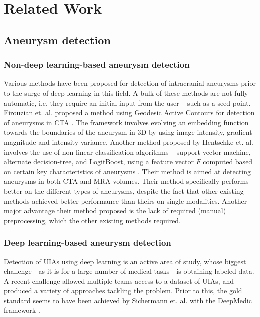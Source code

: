 \chapter{Related Work}


\section{Aneurysm detection}
\subsection{Non-deep learning-based aneurysm detection}
Various methods have been proposed for detection of intracranial aneurysms prior to the surge of deep learning in this field. A bulk of these methods are not fully automatic, i.e. they require an initial input from the user -- such as a seed point. Firouzian et. al. proposed a method using Geodesic Active Contours for detection of aneurysms in CTA \cite{Firouzian2011}. The framework involves evolving an embedding function towards the boundaries of the aneurysm in 3D by using image intensity, gradient magnitude and intensity variance.  
Another method proposed by Hentschke et. al. involves the use of non-linear classification algorithms -- support-vector-machine, alternate decision-tree, and LogitBoost, using a feature vector $F$ computed based on certain key characteristics of aneurysms \cite{Hentschke2014}. Their method is aimed at detecting aneurysms in both CTA and MRA volumes. Their method specifically performs better on the different types of aneurysms, despite the fact that other existing methods achieved better performance than theirs on single modalities. Another major advantage their method proposed is the lack of required (manual) preprocessing, which the other existing methods required. 

\subsection{Deep learning-based aneurysm detection}
Detection of UIAs using deep learning is an active area of study, whose biggest challenge - as it is for a large number of medical tasks - is obtaining labeled data. A recent challenge  allowed multiple teams access to a dataset of UIAs, and produced a variety of approaches tackling the problem. Prior to this, the gold standard seems to have been achieved by Sichermann et. al. \cite{Sichermann2019} with the DeepMedic framework \cite{deepmedic}.

